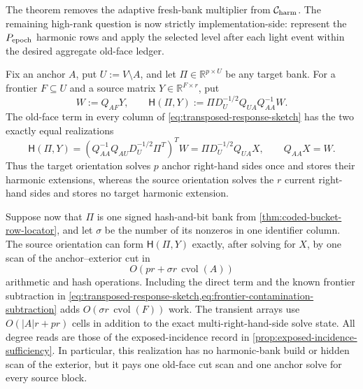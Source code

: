 The theorem removes the adaptive fresh-bank multiplier from
$\mathcal C_{\rm harm}$.  The remaining high-rank question is now strictly
implementation-side: represent the $P_{\rm epoch}$ harmonic rows and apply
the selected level after each light event within the desired aggregate old-face
ledger.

\begin{theorem}
\label{thm:bidirectional-harmonic-application}
Fix an anchor $A$, put $U:=V\setminus A$, and let
$\Pi\in\mathbb R^{p\times U}$ be any target bank.  For a frontier
$F\subseteq U$ and a source matrix $Y\in\mathbb R^{F\times r}$, put
\begin{equation*}
 W:=Q_{AF}Y,
 \qquad
 \mathsf H(\Pi,Y)
 :=\Pi D_U^{-1/2}Q_{UA}Q_{AA}^{-1}W.
\end{equation*}
The old-face term in every column of
\cref{eq:transposed-response-sketch} has the two exactly equal realizations
\begin{equation}
 \mathsf H(\Pi,Y)
 =\left(Q_{AA}^{-1}Q_{AU}D_U^{-1/2}\Pi^T\right)^TW
 =\Pi D_U^{-1/2}Q_{UA}X,
 \qquad Q_{AA}X=W.
 \label{eq:bidirectional-harmonic-identity}
\end{equation}
Thus the target orientation solves $p$ anchor right-hand sides once and
stores their harmonic extensions, whereas the source orientation solves the
$r$ current right-hand sides and stores no target harmonic extension.

Suppose now that $\Pi$ is one signed hash-and-bit bank from
\cref{thm:coded-bucket-row-locator}, and let $\sigma$ be the number of its
nonzeros in one identifier column.  The source orientation can form
$\mathsf H(\Pi,Y)$ exactly, after solving for $X$, by one scan of the
anchor--exterior cut in
\begin{equation}
 O\!\left(pr+\sigma r\,\operatorname{cvol}(A)\right)
 \label{eq:source-oriented-coded-bank-work}
\end{equation}
arithmetic and hash operations.  Including the direct term and the known
frontier subtraction in
\cref{eq:transposed-response-sketch,eq:frontier-contamination-subtraction}
adds
$O(\sigma r\,\operatorname{cvol}(F))$ work.  The transient arrays use
$O(|A|r+pr)$ cells in addition to the exact multi-right-hand-side solve
state.  All degree reads are those of the exposed-incidence record in
\cref{prop:exposed-incidence-sufficiency}.  In particular, this realization
has no harmonic-bank build or hidden scan of the exterior, but it pays one
old-face cut scan and one anchor solve for every source block.
\end{theorem}

